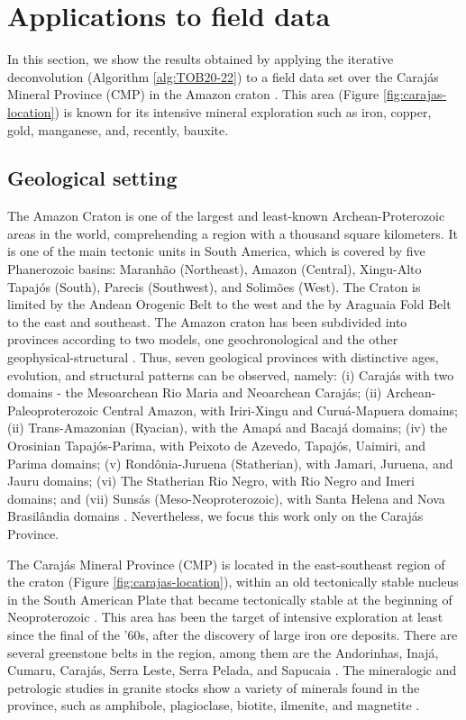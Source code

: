 \section{Applications to field data}
\label{sec:real_data}

In this section, we show the results obtained by applying the iterative deconvolution (Algorithm \ref{alg:TOB20-22}) 
to a field data set over the Caraj{\'a}s Mineral Province (CMP) in the Amazon craton \citep{moroni-etal2001,villas-santos2001}. 
This area (Figure \ref{fig:carajas-location}) is known for its intensive mineral exploration such as iron, copper, gold, 
manganese, and, recently, bauxite.

\subsection{Geological setting}

The Amazon Craton is one of the largest and least-known Archean-Proterozoic areas in the world, comprehending a region with a thousand square kilometers. 
It is one of the main tectonic units in South America, which is covered by five Phanerozoic basins: 
Maranh{\~a}o (Northeast), Amazon (Central), Xingu-Alto Tapaj{\'o}s (South), Parecis (Southwest), and Solim{\~o}es (West). 
The Craton is limited by the Andean Orogenic Belt to the west and the by Araguaia Fold Belt to the east and southeast. 
The Amazon craton has been subdivided into provinces according to two models, one geochronological and the other geophysical-structural 
\citep{amaral1974, teixeira-etal1989, tassinari-macambira1999}. Thus, seven geological provinces with distinctive ages, evolution, and structural 
patterns can be observed, namely: (i) Caraj{\'a}s with two domains - the Mesoarchean Rio Maria and Neoarchean Caraj{\'a}s; 
(ii) Archean-Paleoproterozoic Central Amazon, with Iriri-Xingu and Curuá-Mapuera domains; (ii) Trans-Amazonian (Ryacian), with the Amap{\'a} 
and Bacaj{\'a} domains; (iv) the Orosinian Tapaj{\'o}s-Parima, with Peixoto de Azevedo, Tapaj{\'o}s, Uaimiri, and Parima domains; 
(v) Rond{\^o}nia-Juruena (Statherian), with Jamari, Juruena, and Jauru domains; (vi) The Statherian Rio Negro, with Rio Negro and 
Imeri domains; and (vii) Suns{\'a}s (Meso-Neoproterozoic), with Santa Helena and Nova Brasil{\^a}ndia domains \citep{santos-etal2000}. 
Nevertheless, we focus this work only on the Caraj{\'a}s Province. 

The Caraj{\'a}s Mineral Province (CMP) is located in the east-southeast region of the craton (Figure \ref{fig:carajas-location}), 
within an old tectonically stable nucleus in the 
South American Plate that became tectonically stable at the beginning of Neoproterozoic \citep{salomao-etal2019}. 
This area has been the target of intensive exploration at least since the final of the '60s, after the discovery of large iron ore deposits. 
There are several greenstone belts in the region, among them are the Andorinhas, Inajá, Cumaru, Caraj{\'a}s, Serra Leste, Serra Pelada, and Sapucaia 
\citep{santos-etal2000}. The mineralogic and petrologic studies in granite stocks show a variety of minerals found in the province, such as 
amphibole, plagioclase, biotite, ilmenite, and magnetite \citep{cunha-etal2016}. 

